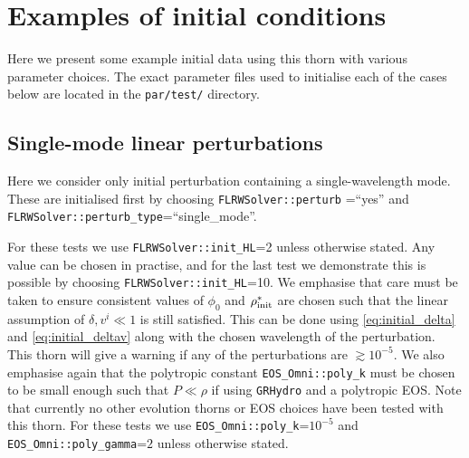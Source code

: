 \section{Examples of initial conditions} \label{sec:tests}

Here we present some example initial data using this thorn with various parameter choices. The exact parameter files used to initialise each of the cases below are located in the \texttt{par/test/} directory. 

%
%

\subsection{Single-mode linear perturbations}

Here we consider only initial perturbation containing a single-wavelength mode. These are initialised first by choosing \texttt{FLRWSolver::perturb} =``yes'' and \texttt{FLRWSolver::perturb\_type}=``single\_mode''. 

For these tests we use \texttt{FLRWSolver::init\_HL}=2 unless otherwise stated. Any value can be chosen in practise, and for the last test we demonstrate this is possible by choosing \texttt{FLRWSolver::init\_HL}=10. We emphasise that care must be taken to ensure consistent values of $\phi_0$ and $\rho^*_{\rm init}$ are chosen such that the linear assumption of $\delta, v^i \ll 1$ is still satisfied. This can be done using \eqref{eq:initial_delta} and \eqref{eq:initial_deltav} along with the chosen wavelength of the perturbation. This thorn will give a warning if any of the perturbations are $\gtrsim 10^{-5}$. We also emphasise again that the polytropic constant \texttt{EOS\_Omni::poly\_k} must be chosen to be small enough such that $P \ll \rho$ if using \texttt{GRHydro} and a polytropic EOS. Note that currently no other evolution thorns or EOS choices have been tested with this thorn. For these tests we use \texttt{EOS\_Omni::poly\_k}=$10^{-5}$ and \texttt{EOS\_Omni::poly\_gamma}=$2$ unless otherwise stated.


